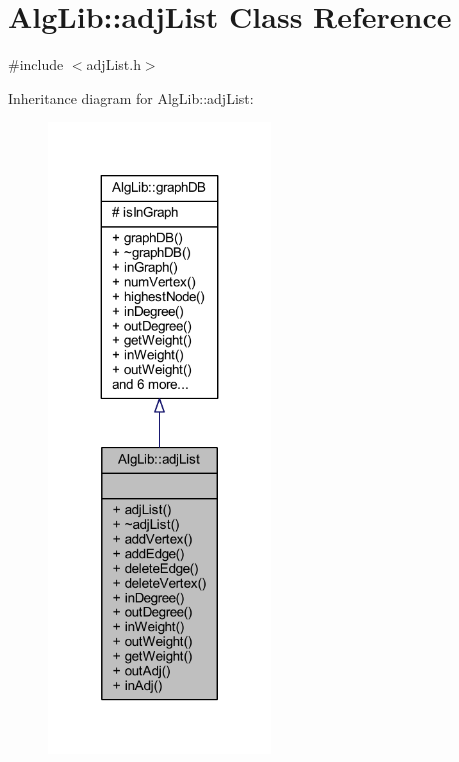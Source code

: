 \hypertarget{class_alg_lib_1_1adj_list}{}\section{Alg\+Lib\+:\+:adj\+List Class Reference}
\label{class_alg_lib_1_1adj_list}


{\ttfamily \#include $<$adj\+List.\+h$>$}



Inheritance diagram for Alg\+Lib\+:\+:adj\+List\+:\nopagebreak
\begin{figure}[H]
\begin{center}
\leavevmode
\includegraphics[width=167pt]{class_alg_lib_1_1adj_list__inherit__graph}
\end{center}
\end{figure}


